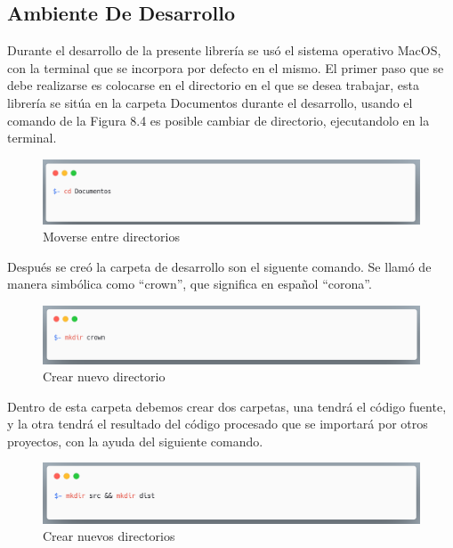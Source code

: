     \subsection{Ambiente De Desarrollo}
    Durante el desarrollo de la presente librería se usó el sistema operativo MacOS, con la terminal que se incorpora por defecto en el mismo.
    El primer paso que se debe realizarse es colocarse en el directorio en el que se desea trabajar, esta librería se sitúa en la carpeta Documentos durante el desarrollo, usando el comando de la Figura 8.4 es posible cambiar de directorio, ejecutandolo en la terminal.
    
    \newline
     \begin{figure}[H]
     \includegraphics[width=1\textwidth]{./Imagenes/image15.png}
     \caption[Moverse entre directorios]{Moverse entre directorios}
         \end{figure}
Después se creó la carpeta de desarrollo son el siguente comando. Se llamó de manera simbólica como “crown”, que significa en español “corona”.
     \begin{figure}[H]
    \includegraphics[width=1\textwidth]{./Imagenes/image7.png}
     \caption[Crear nuevo directorio]{Crear nuevo directorio}
         \end{figure}
    
    Dentro de esta carpeta debemos crear dos carpetas, una tendrá el código fuente, y la otra tendrá el resultado del código procesado que se importará por otros proyectos, con la ayuda del siguiente comando.
    \newline
     \begin{figure}[hbt!]
    \includegraphics[width=1\textwidth]{./Imagenes/image37.png}
     \caption[Crear nuevos directorios]{Crear nuevos directorios}
         \end{figure}
    \newline
    \newline
    
